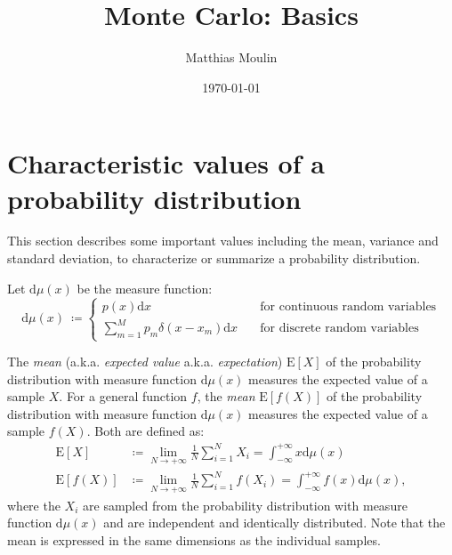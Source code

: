 \documentclass[10pt,a4paper]{article}
\title{Monte Carlo: Basics}
\author{Matthias Moulin}
\date{\today}
\numberwithin{equation}{section}
\begin{document}
\maketitle

\section{Characteristic values of a probability distribution}
\label{section:characteristicvalues}
This section describes some important values including the mean, variance and standard deviation, to characterize or summarize a probability distribution.

Let $\mathrm{d}\mu\left(x\right)$ be the measure function:
\begin{equation}
\mathrm{d}\mu\left(x\right)\ \coloneqq
\begin{cases}
p\left(x\right) \mathrm{d}x &\quad\text{for continuous random variables} \\
\sum_{m=1}^{M} p_{m} \delta\left(x - x_{m}\right) \mathrm{d}x &\quad\text{for discrete random variables} \
\end{cases}
\end{equation}

The \textit{mean} (a.k.a. \textit{expected value} a.k.a. \textit{expectation}) $\mathrm{E}\left[X\right]$ of the probability distribution with measure function $\mathrm{d}\mu\left(x\right)$ measures the expected value of a sample $X$. For a general function $f$, the \textit{mean} $\mathrm{E}\left[f\left(X\right)\right]$ of the probability distribution with measure function $\mathrm{d}\mu\left(x\right)$ measures the expected value of a sample $f\left(X\right)$. Both are defined as:
\begin{align}
\label{equation:E}\mathrm{E}\left[X\right] 						&\coloneqq\lim_{N \to +\infty} \frac{1}{N} \sum_{i=1}^{N} X_{i} = \int_{-\infty}^{+\infty} x \mathrm{d}\mu\left(x\right) \\
\label{equation:Ef}\mathrm{E}\left[f\left(X\right)\right] 		&\coloneqq\lim_{N \to +\infty} \frac{1}{N} \sum_{i=1}^{N} f\left(X_{i}\right) = \int_{-\infty}^{+\infty} f\left(x\right) \mathrm{d}\mu\left(x\right),
\end{align}
where the $X_{i}$ are sampled from the probability distribution with measure function $\mathrm{d}\mu\left(x\right)$ and are independent and identically distributed. Note that the mean is expressed in the same dimensions as the individual samples.
\end{document}
